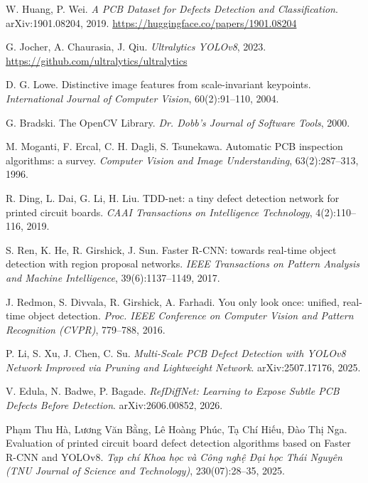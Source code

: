 \documentclass[11pt,a4paper]{article}
\begin{document}
\begin{enumerate}[label={[\arabic*]},leftmargin=2.4em,itemsep=4pt]
  \item\label{ref:huang} W. Huang, P. Wei. \emph{A PCB Dataset for Defects Detection and Classification}. arXiv:1901.08204, 2019. \url{https://huggingface.co/papers/1901.08204}
  \item\label{ref:ultralytics} G. Jocher, A. Chaurasia, J. Qiu. \emph{Ultralytics YOLOv8}, 2023. \url{https://github.com/ultralytics/ultralytics}
  \item\label{ref:lowe} D. G. Lowe. Distinctive image features from scale-invariant keypoints. \emph{International Journal of Computer Vision}, 60(2):91--110, 2004.
  \item\label{ref:bradski} G. Bradski. The OpenCV Library. \emph{Dr. Dobb's Journal of Software Tools}, 2000.
  \item\label{ref:moganti} M. Moganti, F. Ercal, C. H. Dagli, S. Tsunekawa. Automatic PCB inspection algorithms: a survey. \emph{Computer Vision and Image Understanding}, 63(2):287--313, 1996.
  \item\label{ref:ding} R. Ding, L. Dai, G. Li, H. Liu. TDD-net: a tiny defect detection network for printed circuit boards. \emph{CAAI Transactions on Intelligence Technology}, 4(2):110--116, 2019.
  \item\label{ref:ren} S. Ren, K. He, R. Girshick, J. Sun. Faster R-CNN: towards real-time object detection with region proposal networks. \emph{IEEE Transactions on Pattern Analysis and Machine Intelligence}, 39(6):1137--1149, 2017.
  \item\label{ref:redmon} J. Redmon, S. Divvala, R. Girshick, A. Farhadi. You only look once: unified, real-time object detection. \emph{Proc. IEEE Conference on Computer Vision and Pattern Recognition (CVPR)}, 779--788, 2016.
  \item\label{ref:li} P. Li, S. Xu, J. Chen, C. Su. \emph{Multi-Scale PCB Defect Detection with YOLOv8 Network Improved via Pruning and Lightweight Network}. arXiv:2507.17176, 2025.
  \item\label{ref:refdiff} V. Edula, N. Badwe, P. Bagade. \emph{RefDiffNet: Learning to Expose Subtle PCB Defects Before Detection}. arXiv:2606.00852, 2026.
  \item\label{ref:ha} Phạm Thu Hà, Lương Văn Bằng, Lê Hoàng Phúc, Tạ Chí Hiếu, Đào Thị Nga. Evaluation of printed circuit board defect detection algorithms based on Faster R-CNN and YOLOv8. \emph{Tạp chí Khoa học và Công nghệ Đại học Thái Nguyên (TNU Journal of Science and Technology)}, 230(07):28--35, 2025.

\end{enumerate}
\end{document}
